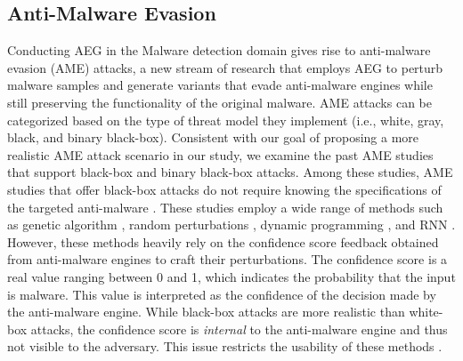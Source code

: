 \documentclass[letterpaper]{article}
\begin{document}
\subsection{Anti-Malware Evasion}
    Conducting AEG in the Malware detection domain gives rise to anti-malware evasion (AME) attacks, a new stream of research that employs AEG to perturb malware samples and generate variants that evade anti-malware engines while still preserving the functionality of the original malware. AME attacks can be categorized based on the type of threat model they implement (i.e., white, gray, black, and binary black-box). Consistent with our goal of proposing a more realistic AME attack scenario in our study, we examine the past AME studies that support black-box and binary black-box attacks.
    Among these studies, AME studies that offer black-box attacks do not require knowing the specifications of the targeted anti-malware \cite{demetrio2020efficient,castroandbiggio2019poster,castroandschmitt2019armed,chenB2019adversarial,park2019generation,suciu2019exploring,hu2018black}. These studies employ a wide range of methods such as genetic algorithm \cite{demetrio2020efficient}, random perturbations \cite{castroandschmitt2019armed,chenB2019adversarial}, dynamic programming \cite{park2019generation}, and RNN \cite{hu2018black}. However, these methods heavily rely on the confidence score feedback obtained from anti-malware engines to craft their perturbations. The confidence score is a real value ranging between 0 and 1, which indicates the probability that the input is malware. This value is interpreted as the confidence of the decision made by the anti-malware engine. While black-box attacks are more realistic than white-box attacks, the confidence score is \textit{internal} to the anti-malware engine and thus not visible to the adversary. This issue restricts the usability of these methods \cite{rosenberg2019defense}.
\end{document}
